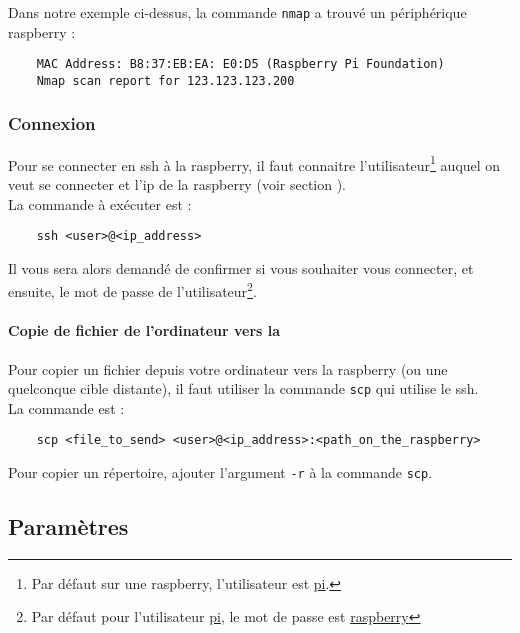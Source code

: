 Dans notre exemple ci-dessus, la commande \texttt{nmap} a trouvé un périphérique \gls{raspberry} :

\begin{verbatim}
    MAC Address: B8:37:EB:EA: E0:D5 (Raspberry Pi Foundation)
    Nmap scan report for 123.123.123.200
\end{verbatim}

\subsubsection{Connexion}

Pour se connecter en \gls{ssh} à la \gls{raspberry}, il faut connaitre l'utilisateur\footnote{Par défaut sur une
    \gls{raspberry}, l'utilisateur est \underline{pi}.} auquel on veut se connecter et l'\gls{ip} de la \gls{raspberry}
(voir section ).\\
La commande à exécuter est :

\begin{verbatim}
    ssh <user>@<ip_address>
\end{verbatim}

Il vous sera alors demandé de confirmer si vous souhaiter vous connecter, et ensuite, le mot de passe de
l'utilisateur\footnote{Par défaut pour l'utilisateur \underline{pi}, le mot de passe est \underline{raspberry}}.

\paragraph{Copie de fichier de l'ordinateur vers la }
\label{sec:copieVersRaspberry}

Pour copier un fichier depuis votre ordinateur vers la \gls{raspberry} (ou une quelconque cible distante), il faut
utiliser la commande \texttt{scp} qui utilise le \gls{ssh}.\\
La commande est :

\begin{verbatim}
    scp <file_to_send> <user>@<ip_address>:<path_on_the_raspberry>
\end{verbatim}

Pour copier un répertoire, ajouter l'argument \texttt{-r} à la commande \texttt{scp}.

\subsection{Paramètres}

